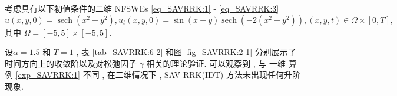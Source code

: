 	\begin{example}\label{exp_SAVRRK:2}
		考虑具有以下初值条件的二维 NFSWEs \eqref{eq_SAVRRK:1} - \eqref{eq_SAVRRK:3}
		\begin{equation*}
		u(x , y , 0)=\operatorname{sech}\left(x^2+y^2\right) , u_t(x , y , 0)=\sin (x+y) \operatorname{sech}\left(-2\left(x^2+y^2\right)\right) , (x , y , t) \in \Omega \times[0 , T] , 
		\end{equation*}
		其中 $\Omega=[-5 , 5] \times[-5 , 5]$.
		\end{example}
			
		设$\alpha=1.5$ 和 $T=1$ , 表 \ref{tab_SAVRRK:6-2} 和图 \ref{fig_SAVRRK:2-1} 分别展示了时间方向上的收敛阶以及对松弛因子 $\gamma$ 相关的理论验证.
		可以观察到 , 与 一维 算例 \ref{exp_SAVRRK:1} 不同 , 在二维情况下 , SAV-RRK(IDT) 方法未出现任何升阶现象.

